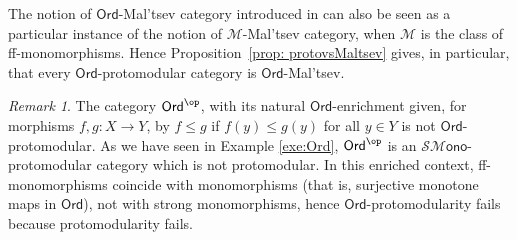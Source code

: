\documentclass[10pt,a4paper]{amsart}
\theoremstyle{plain}
\theoremstyle{definition}
\theoremstyle{remark}
\newtheorem{remark}[subsection]{Remark}
\newcommand{\Ord}{\ensuremath{\mathsf{Ord}}}
\newcommand{\M}{\ensuremath{\mathscr{M}}}
\newcommand{\SMono}{\ensuremath{\mathscr{SM}\mathsf{ono}}}
\begin{document}
The notion of $\Ord$-Mal'tsev category introduced in \cite{CR} can also be seen as a particular instance of the notion of $\M$-Mal'tsev category, when $\M$ is the class of ff-monomorphisms. Hence Proposition~\ref{prop: protovsMaltsev}  gives, in particular, that every $\Ord$-protomodular category is $\Ord$-Mal'tsev.

\begin{remark}
The category $\Ord^\op$, with its natural $\Ord$-enrichment given, for morphisms $f,g\colon X\to Y$, by $f\le g$ if $f(y)\le g(y)$ for all $y\in Y$ is not $\Ord$-protomodular. As we have seen in Example \ref{exe:Ord}, $\Ord^\op$ is an $\SMono$-protomodular category which is not protomodular. In this enriched context, ff-monomorphisms coincide with monomorphisms (that is, surjective monotone maps in $\Ord$), not with strong monomorphisms, hence $\Ord$-protomodularity fails because protomodularity fails.
\end{remark}
\end{document}
